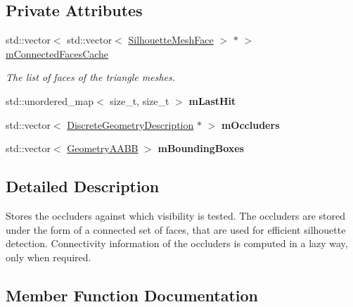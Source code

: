 \subsection*{Private Attributes}
\begin{DoxyCompactItemize}
\item 
std\+::vector$<$ std\+::vector$<$ \mbox{\hyperlink{classvisilib_1_1_silhouette_mesh_face}{Silhouette\+Mesh\+Face}} $>$ $\ast$ $>$ \mbox{\hyperlink{classvisilib_1_1_geometry_occluder_set_a96611893ad5c36867c415cf68cd320c4}{m\+Connected\+Faces\+Cache}}
\begin{DoxyCompactList}\small\item\em The list of faces of the triangle meshes. \end{DoxyCompactList}\item 
\mbox{\label{classvisilib_1_1_geometry_occluder_set_aac4816a11b1e4edc9193696c906ab206}} 
std\+::unordered\+\_\+map$<$ size\+\_\+t, size\+\_\+t $>$ {\bfseries m\+Last\+Hit}
\item 
\mbox{\label{classvisilib_1_1_geometry_occluder_set_a0564f625a9de859d38231bf28dbbdd92}} 
std\+::vector$<$ \mbox{\hyperlink{structvisilib_1_1_discrete_geometry_description}{Discrete\+Geometry\+Description}} $\ast$ $>$ {\bfseries m\+Occluders}
\item 
\mbox{\label{classvisilib_1_1_geometry_occluder_set_a61e7f53997ce8a65ed8bda96773ec406}} 
std\+::vector$<$ \mbox{\hyperlink{classvisilib_1_1_geometry_a_a_b_b}{Geometry\+A\+A\+BB}} $>$ {\bfseries m\+Bounding\+Boxes}
\end{DoxyCompactItemize}


\subsection{Detailed Description}
Stores the occluders against which visibility is tested. The occluders are stored under the form of a connected set of faces, that are used for efficient silhouette detection. Connectivity information of the occluders is computed in a lazy way, only when required. 

\subsection{Member Function Documentation}
\mbox{\label{classvisilib_1_1_geometry_occluder_set_a653a182d2a7f4ac669fe67693574b128}} 
